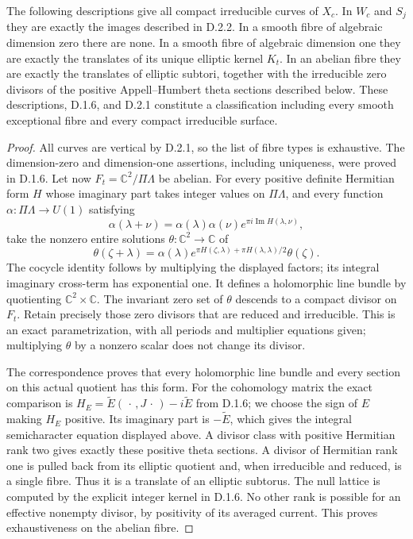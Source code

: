 \begin{theorem}\label{fam:src:D.2.3}\label{fam:st:D.2.3}
The following descriptions give all compact irreducible curves of $X_c$.
In $W_c$ and $S_j$ they are exactly the images described in D.2.2.
In a smooth fibre of algebraic dimension zero there are none. In a
smooth fibre of algebraic dimension one they are exactly the translates
of its unique elliptic kernel $K_t$. In an abelian fibre they are exactly
the translates of elliptic subtori, together with the irreducible zero
divisors of the positive Appell--Humbert theta sections described below.
These descriptions, D.1.6, and D.2.1 constitute a classification including
every smooth exceptional fibre and every compact irreducible surface.
\end{theorem}
\begin{proof}
All curves are vertical by D.2.1, so the list of fibre types is exhaustive.
The dimension-zero and dimension-one assertions, including uniqueness,
were proved in D.1.6. Let now $F_t=\mathbb C^2/\Pi\Lambda$ be abelian.
For every positive definite Hermitian form $H$ whose imaginary part takes
integer values on $\Pi\Lambda$, and every function
$\alpha:\Pi\Lambda\to U(1)$ satisfying
\[
 \alpha(\lambda+\nu)=\alpha(\lambda)\alpha(\nu)
                 e^{\pi i\operatorname{Im}H(\lambda,\nu)},
\]
take the nonzero entire solutions $\theta:\mathbb C^2\to\mathbb C$ of
\begin{equation}\label{fam:eq:cd-theta-sections}
 \theta(\zeta+\lambda)=\alpha(\lambda)
 e^{\pi H(\zeta,\lambda)+\pi H(\lambda,\lambda)/2}\theta(\zeta).
\end{equation}
The cocycle identity follows by multiplying the displayed factors; its
integral imaginary cross-term has exponential one. It defines a
holomorphic line bundle by quotienting $\mathbb C^2\times\mathbb C$.
The invariant zero set of $\theta$ descends to a compact divisor on
$F_t$. Retain precisely those zero divisors that are reduced and
irreducible. This is an exact parametrization, with all periods and
multiplier equations given; multiplying $\theta$ by a nonzero scalar
does not change its divisor.

The correspondence \cite[Theorem 4.1 and equation (4.3)]{Schnell19} proves
that every holomorphic line bundle and every section on this actual
quotient has this form. For the cohomology matrix the exact comparison is
$H_E=\widetilde E(\,\cdot\,,J\,\cdot\,)-i\widetilde E$ from D.1.6;
we choose the sign of $E$ making $H_E$ positive. Its imaginary part is
$-\widetilde E$, which gives the integral semicharacter equation displayed
above. A divisor class with positive Hermitian rank two gives exactly
these positive theta sections. A divisor of Hermitian rank one is pulled
back from its elliptic quotient and, when irreducible and reduced, is a
single fibre. Thus it is a translate of an elliptic subtorus. The null
lattice is computed by the explicit integer kernel in D.1.6. No other
rank is possible for an effective nonempty divisor, by positivity of its
averaged current. This proves exhaustiveness on the abelian fibre.


\end{proof}

